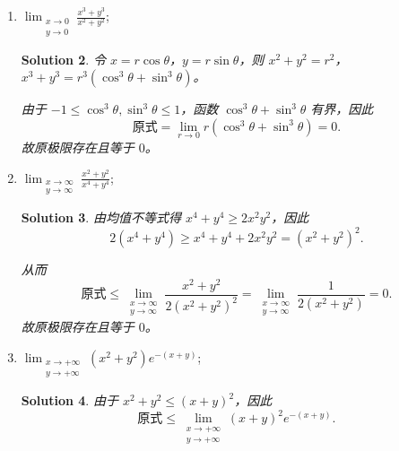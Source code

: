 \documentclass[a4paper,12pt]{article}
\newtheorem*{sol}{Solution}
\begin{document}
\begin{enumerate}
\begin{enumerate}[label=(\arabic*)]
\begin{sol}
                              因此
                              $$
                                    \text{原式} = \lim_{\substack{x \to +\infty \\ y \to a}} \left( 1 + \frac{1}{x} \right)^x = \mathrm{e}.
                              $$
                              故原极限存在且等于 $\mathrm{e}$。
                        \end{sol}
                  \item $\lim_{\substack{x \to 0 \\ y \to 0}} \frac{x^3 + y^3}{x^2 + y^2}$;
                        \begin{sol}
                              令 $x = r\cos\theta$，$y = r\sin\theta$，则 $x^2 + y^2 = r^2$，$x^3 + y^3 = r^3(\cos^3\theta + \sin^3\theta)$。

                              由于 $-1 \leq \cos^3\theta, \sin^3\theta \leq 1$，函数 $\cos^3\theta + \sin^3\theta$ 有界，因此
                              $$
                                    \text{原式} = \lim_{r\to 0} r(\cos^3\theta + \sin^3\theta) = 0.
                              $$
                              故原极限存在且等于 $0$。
                        \end{sol}
                  \item $\lim_{\substack{x \to \infty \\ y \to \infty}} \frac{x^2 + y^2}{x^4 + y^4}$;
                        \begin{sol}
                              由均值不等式得 $x^4 + y^4 \geq 2x^2y^2$，因此
                              $$
                                    2(x^4 + y^4) \geq x^4 + y^4 + 2x^2y^2 = (x^2 + y^2)^2.
                              $$

                              从而
                              $$
                                    \text{原式} \leq \lim_{\substack{x \to \infty \\ y \to \infty}} \frac{x^2+y^2}{2(x^2+y^2)^2} = \lim_{\substack{x \to \infty \\ y \to \infty}} \frac{1}{2(x^2+y^2)} = 0.
                              $$
                              故原极限存在且等于 $0$。
                        \end{sol}
                  \item $\lim_{\substack{x \to +\infty \\ y \to +\infty}} (x^2 + y^2)e^{-(x+y)}$;
                        \begin{sol}
                              由于 $x^2 + y^2 \leq (x+y)^2$，因此
                              $$
                                    \text{原式} \leq \lim_{\substack{x \to +\infty \\ y \to +\infty}} (x+y)^2 e^{-(x+y)}.
                              $$
                              

\end{sol}
\end{enumerate}
\end{enumerate}
\end{document}
